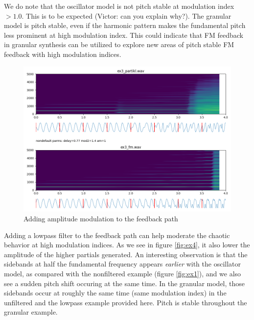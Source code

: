 \documentclass[runningheads,a4paper]{llncs}
\begin{document}
We do note that the oscillator model is not pitch stable at modulation index $> 1.0$. This is to be expected (Victor: can you explain why?). The granular model is pitch stable, even if the harmonic pattern makes the fundamental pitch less prominent at high modulation index. This could indicate that FM feedback in granular synthesis can be utilized to explore new areas of pitch stable FM feedback with high modulation indices.

\begin{figure}
	\centering
	\includegraphics[width=.95\textwidth]{ex3_compare.png}
	\caption{Adding amplitude modulation to the feedback path}
	\label{fig:ex3}
\end{figure}

Adding a lowpass filter to the feedback path can help moderate the chaotic behavior at high modulation indices. As we see in figure \ref{fig:ex4}, it also lower the amplitude of the higher partials generated. An interesting observation is that the sidebands at half the fundamental frequency appears \emph{earlier} with the oscillator model, as compared with the nonfiltered example (figure \ref{fig:ex1}), and we also see a sudden pitch shift occuring at the same time. In the granular model, those sidebands occur at roughly the same time (same modulation index) in the unfiltered and the lowpass example provided here. Pitch is stable throughout the granular example.
\end{document}
